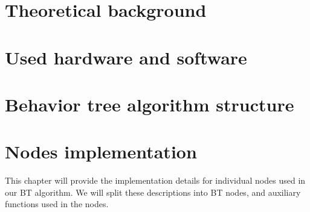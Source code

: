 \documentclass{ctuthesis}
\begin{document}
    \maketitle

    

    \chapter{Theoretical background}
        
        
        
        

    \chapter{Used hardware and software}
        
        
                

    \chapter{Behavior tree algorithm structure}
        

    \chapter{Nodes implementation}
        This chapter will provide the implementation details for individual nodes used in our BT algorithm. We will split these descriptions into BT nodes, and auxiliary functions used in the nodes.
        
        
        




    \printbibliography
\end{document}
